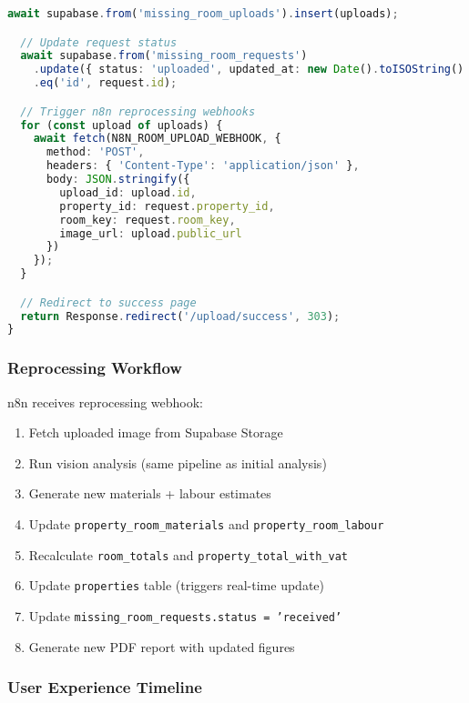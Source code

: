 \documentclass[11pt,a4paper]{article}
\begin{document}
\begin{lstlisting}[language=TypeScript, caption=Upload API Handler]
  await supabase.from('missing_room_uploads').insert(uploads);

  // Update request status
  await supabase.from('missing_room_requests')
    .update({ status: 'uploaded', updated_at: new Date().toISOString() })
    .eq('id', request.id);

  // Trigger n8n reprocessing webhooks
  for (const upload of uploads) {
    await fetch(N8N_ROOM_UPLOAD_WEBHOOK, {
      method: 'POST',
      headers: { 'Content-Type': 'application/json' },
      body: JSON.stringify({
        upload_id: upload.id,
        property_id: request.property_id,
        room_key: request.room_key,
        image_url: upload.public_url
      })
    });
  }

  // Redirect to success page
  return Response.redirect('/upload/success', 303);
}
\end{lstlisting}

\subsubsection{Reprocessing Workflow}

n8n receives reprocessing webhook:
\begin{enumerate}
  \item Fetch uploaded image from Supabase Storage
  \item Run vision analysis (same pipeline as initial analysis)
  \item Generate new materials + labour estimates
  \item Update \texttt{property\_room\_materials} and \texttt{property\_room\_labour}
  \item Recalculate \texttt{room\_totals} and \texttt{property\_total\_with\_vat}
  \item Update \texttt{properties} table (triggers real-time update)
  \item Update \texttt{missing\_room\_requests.status = 'received'}
  \item Generate new PDF report with updated figures
\end{enumerate}

\subsubsection{User Experience Timeline}
\end{document}
